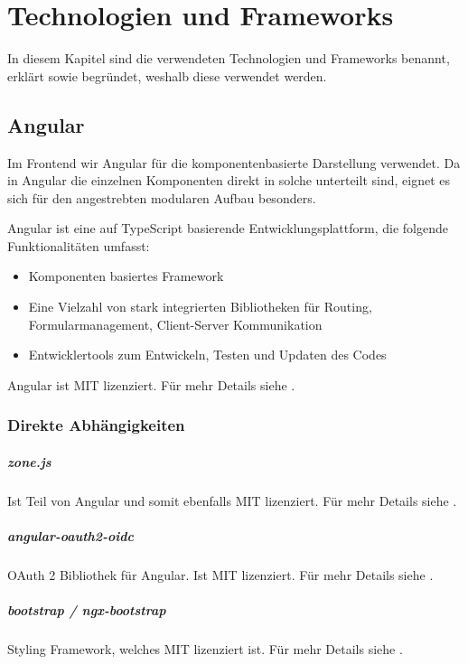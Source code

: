 \chapter{Technologien und Frameworks}\label{ch:technologien-&-frameworks}

In diesem Kapitel sind die verwendeten Technologien und Frameworks benannt, erklärt
sowie begründet, weshalb diese verwendet werden.

\section{Angular}\label{sec:angular}

Im Frontend wir Angular für die komponentenbasierte Darstellung verwendet.
Da in Angular die einzelnen Komponenten direkt in solche unterteilt sind,
eignet es sich für den angestrebten modularen Aufbau besonders.

Angular ist eine auf \gls{TypeScript} basierende Entwicklungsplattform, die folgende Funktionalitäten umfasst:
\begin{itemize}
    \item Komponenten basiertes Framework
    \item Eine Vielzahl von stark integrierten Bibliotheken für Routing, Formularmanagement, Client-Server Kommunikation
    \item Entwicklertools zum Entwickeln, Testen und Updaten des Codes
\end{itemize}
\cite{about-angular}

Angular ist MIT lizenziert.
Für mehr Details siehe .

\subsection{Direkte Abhängigkeiten}

\paragraph{zone.js}
Ist Teil von Angular und somit ebenfalls MIT lizenziert.
Für mehr Details siehe .

\paragraph{angular-oauth2-oidc}
OAuth 2 Bibliothek für Angular.
Ist MIT lizenziert.
Für mehr Details siehe .

\paragraph{bootstrap / ngx-bootstrap}
Styling Framework, welches MIT lizenziert ist.
Für mehr Details siehe .

